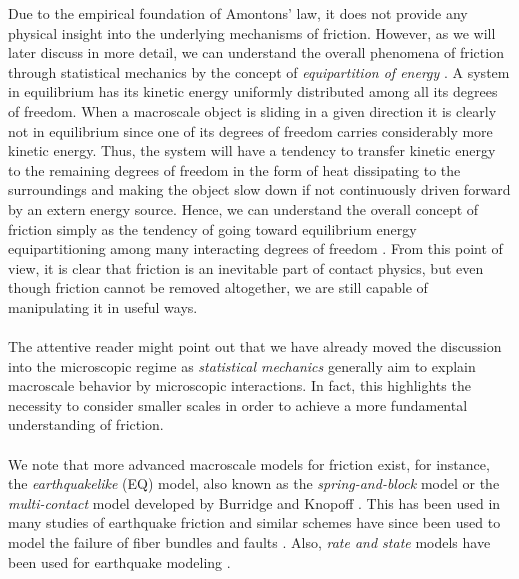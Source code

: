 Due to the empirical foundation of Amontons’ law, it does not provide any
physical insight into the underlying mechanisms of friction. However, as we will
later discuss in more detail, we can understand the overall phenomena of
friction through statistical mechanics by the concept of \textit{equipartition
of energy} \cite{Manini_2016}. A system in equilibrium has its kinetic energy
uniformly distributed among all its degrees of freedom. When a macroscale object
is sliding in a given direction it is clearly not in equilibrium since one of
its degrees of freedom carries considerably more kinetic energy. Thus, the
system will have a tendency to transfer kinetic energy to the remaining
degrees of freedom in the form of heat dissipating to the surroundings and making the object slow down if not continuously driven forward by an extern energy source.  Hence, we can understand the overall concept of friction simply
as the tendency of going toward equilibrium energy equipartitioning among many
interacting degrees of freedom \cite{Manini_2016}. From this point of view, it is
clear that friction is an inevitable part of contact physics, but even though
friction cannot be removed altogether, we are still capable of manipulating it
in useful ways. \\
\\
The attentive reader might point out that we have already moved the discussion
into the microscopic regime as \textit{statistical mechanics} generally
aim to explain macroscale behavior by microscopic interactions. In fact, this 
highlights the necessity to consider smaller scales in order to achieve a more fundamental understanding of friction.
\\
\\
We note that more advanced macroscale models for friction exist, for instance, the \textit{earthquakelike} (EQ) model, also known as the \textit{spring-and-block} model or the \textit{multi-contact} model \cite{Mani_2016} developed by Burridge and Knopoff \cite{Burridge_1967}. This has been used in many studies of earthquake friction \cite{PhysRevLett.88.096102} and similar schemes have since been used to model the failure of fiber bundles and faults \cite{newman_failure_1991, Smalley_1985}. Also, \textit{rate and state} models have been used for earthquake modeling \cite{SELVADURAI2023229689}.







